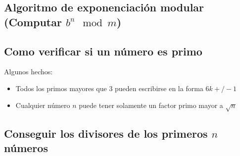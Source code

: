 \subsection{Algoritmo de exponenciaci\'on modular (Computar $b^n\mod m$)}
\pagebreak
\subsection{Como verificar si un n\'umero es primo}
Algunos hechos:
\begin{itemize}
	\item Todos los primos mayores que $3$ pueden escribirse en la forma $6k+/-1$
	\item Cualquier n\'umero $n$ puede tener solamente un factor primo mayor a $\sqrt{n}$
\end{itemize}
\subsection{Conseguir los divisores de los primeros $n$ n\'umeros}
